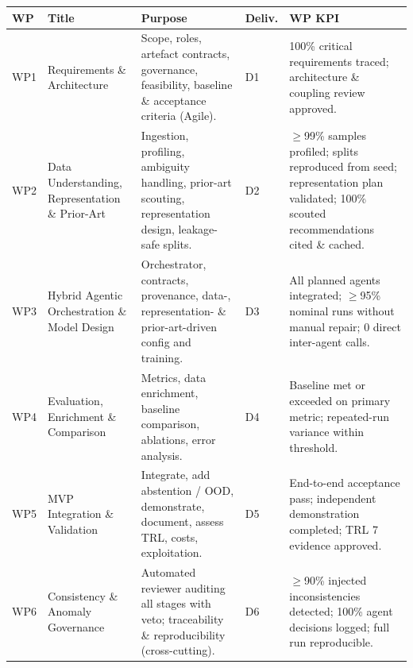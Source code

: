 \documentclass[11pt,a4paper]{article}
\newcommand{\hd}[1]{\cellcolor{hdr}\textbf{#1}}
\begin{document}
\vspace{4pt}
\noindent
\begin{minipage}{\textwidth}
\begin{tabularx}{\textwidth}{|Y{0.8cm}|P{3.1cm}|L|Y{1.0cm}|L|}
\hline
\hd{WP} & \hd{Title} & \hd{Purpose} & \hd{Deliv.} & \hd{WP KPI} \\ \hline
WP1 & Requirements \& Architecture & Scope, roles, artefact contracts, governance, feasibility, baseline \& acceptance criteria (Agile). & D1 & 100\% critical requirements traced; architecture \& coupling review approved. \\ \hline
WP2 & Data Understanding, Representation \& Prior-Art & Ingestion, profiling, ambiguity handling, prior-art scouting, representation design, leakage-safe splits. & D2 & $\geq$99\% samples profiled; splits reproduced from seed; representation plan validated; 100\% scouted recommendations cited \& cached. \\ \hline
WP3 & Hybrid Agentic Orchestration \& Model Design & Orchestrator, contracts, provenance, data-, representation- \& prior-art-driven config and training. & D3 & All planned agents integrated; $\geq$95\% nominal runs without manual repair; 0 direct inter-agent calls. \\ \hline
WP4 & Evaluation, Enrichment \& Comparison & Metrics, data enrichment, baseline comparison, ablations, error analysis. & D4 & Baseline met or exceeded on primary metric; repeated-run variance within threshold. \\ \hline
WP5 & MVP Integration \& Validation & Integrate, add abstention / OOD, demonstrate, document, assess TRL, costs, exploitation. & D5 & End-to-end acceptance pass; independent demonstration completed; TRL 7 evidence approved. \\ \hline
WP6 & Consistency \& Anomaly Governance & Automated reviewer auditing all stages with veto; traceability \& reproducibility (cross-cutting). & D6 & $\geq$90\% injected inconsistencies detected; 100\% agent decisions logged; full run reproducible. \\ \hline
\end{tabularx}
\end{minipage}
\end{document}
